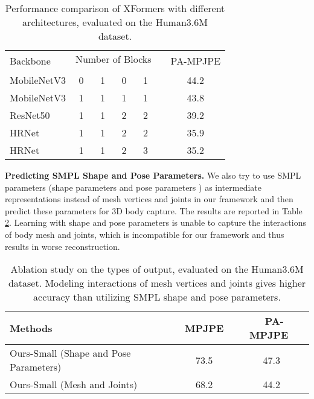 \documentclass{article}
\newcommand\mypara[1]{\noindent\textbf{#1}}
\begin{document}
\begin{table}[h]
\centering
\renewcommand{\tabcolsep}{5pt}
\small
{
\begin{tabular}{lcccccc}
\toprule
\multirow{2}{*}{Backbone} & \multicolumn{4}{c}{Number of Blocks} && \multirow{2}{*}{PA-MPJPE} \\
\cline{2-5}
 &  & & & &&  \\ 
\midrule
MobileNetV3 & 0 & 1 & 0 & 1 &&   44.2     \\
MobileNetV3 & 1 & 1 & 1 & 1 &&   43.8     \\
ResNet50 & 1 & 1 & 2 & 2 &&   39.2     \\
HRNet & 1 & 1 & 2 & 2 &&  35.9     \\
HRNet & 1 & 1 & 2 & 3 &&  35.2     \\
\bottomrule
\end{tabular}
}
\caption{
Performance comparison of XFormers with different architectures, evaluated on the Human3.6M dataset.
}
\label{tbl:supp_ablation_settings}
\end{table}


\mypara{Predicting SMPL Shape and Pose Parameters.} 
We also try to use SMPL parameters (shape parameters  and pose parameters ) as intermediate representations instead of mesh vertices and joints in our framework and then predict these parameters for 3D body capture. The results are reported in Table \ref{tbl:supp_ablation_poseshape}. Learning with shape and pose parameters is unable to capture the interactions of body mesh and joints, which is incompatible for our framework and thus results in worse reconstruction. 

\begin{table}[h]
\small
\renewcommand{\tabcolsep}{1.5pt}
\centering
{
\begin{tabular}{lcc}
\toprule
Methods         & ~MPJPE~ &  ~PA-MPJPE~  \\ 
\midrule
Ours-Small (Shape and Pose Parameters)              &   73.5       & 47.3     \\ 
Ours-Small (Mesh and Joints) &   68.2    & 44.2   \\
\bottomrule
\end{tabular}
}
\caption{
Ablation study on the types of output, evaluated on the Human3.6M dataset. Modeling interactions of mesh vertices and joints gives higher accuracy than utilizing SMPL shape and pose parameters.
}
\label{tbl:supp_ablation_poseshape}
\end{table}
\end{document}
